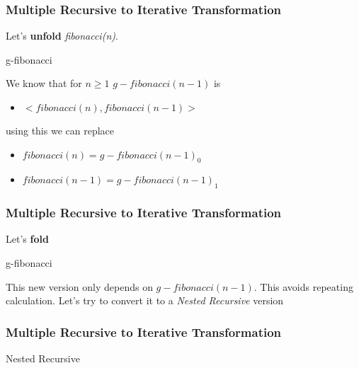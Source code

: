 \documentclass{beamer}
\begin{document}
\begin{frame}
	\frametitle{Multiple Recursive to Iterative Transformation}
	Let's \textbf{unfold} \textit{fibonacci(n)}.
	\begin{block}{g-fibonacci}
		\tiny
		\begin{algorithmic}[1]
					\State{}
				\Else
					\State{}
				\EndIf
			\EndProcedure
		\end{algorithmic}
	\end{block}
	We know that for $n \geq 1$ $g-fibonacci(n-1)$ is 
	\begin{itemize}
		\item $<fibonacci(n),fibonacci(n-1)>$
	\end{itemize}
	using this we can replace
	\begin{itemize}
		\item $fibonacci(n) = g-fibonacci(n-1)_0$
		\item $fibonacci(n-1) = g-fibonacci(n-1)_1$
	\end{itemize}
\end{frame}
\begin{frame}
	\frametitle{Multiple Recursive to Iterative Transformation}
	Let's \textbf{fold}
	\begin{block}{g-fibonacci}
		\tiny
		\begin{algorithmic}[1]
					\State{}
				\Else
						\State{}
				\EndIf
			\EndProcedure
		\end{algorithmic}
	\end{block}
	This new version only depends on $g-fibonacci(n-1)$. This avoids repeating calculation. Let's try to convert it to a \textit{Nested Recursive} version
\end{frame}
\begin{frame}
	\frametitle{Multiple Recursive to Iterative Transformation}
	\begin{block}{Nested Recursive}
		\begin{algorithmic}[1]
					\State{}
				\Else
						\State{}
					\Else
						\State{}
					\EndIf
				\EndIf
			\EndProcedure
		\end{algorithmic}
	\end{block}
\end{frame}
\end{document}
